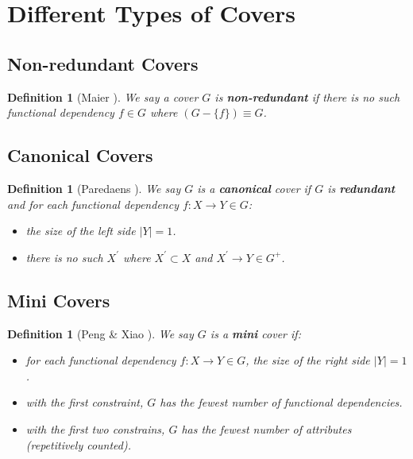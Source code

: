 \documentclass[11pt]{book}
\newtheorem{mydef}[thm]{Definition}
\begin{document}
\section{Different Types of Covers}

\subsection{Non-redundant Covers}

\begin{mydef}[Maier \cite{maier1980minimum}]
We say a cover $G$ is \textbf{non-redundant} if there is no such functional dependency $f \in G$ where $(G - \{f\}) \equiv G$.
\end{mydef}

\subsection{Canonical Covers}

\begin{mydef}[Paredaens \cite{paredaens1977functional}]
We say $G$ is a \textbf{canonical} cover if $G$ is \textbf{redundant} and for each functional dependency $f: X \rightarrow Y \in G$:
  \begin{itemize}
	\item the size of the left side $\lvert Y \rvert = 1$.
	\item there is no such $X^{'}$ where $X^{'} \subset X$ and $X^{'} \rightarrow Y \in G^{+}$.
  \end{itemize}
\end{mydef}

\subsection{Mini Covers}

\begin{mydef}[Peng \& Xiao \cite{peng2016optimal}]
We say $G$ is a \textbf{mini} cover if:
  \begin{itemize}
  	\item for each functional dependency $f: X \rightarrow Y \in G$, the size of the right side $\lvert Y \rvert = 1$.
  	\item with the first constraint, $G$ has the fewest number of functional dependencies.
  	\item with the first two constrains, $G$ has the fewest number of attributes (repetitively counted).
  \end{itemize}
\end{mydef}
\end{document}
